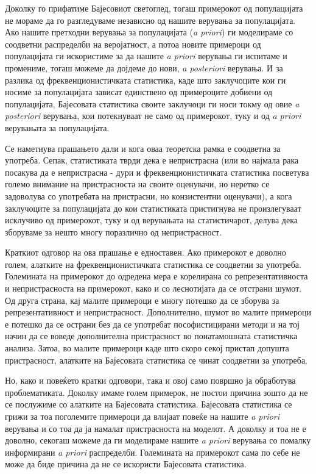 \documentclass[12pt]{article}
\numberwithin{equation}{section}
\begin{document}
Доколку го прифатиме Бајесовиот светоглед, тогаш примерокот од популацијата не мораме да го разгледуваме независно од нашите верувања за популацијата. Ако нашите претходни верувања за популацијата (\textit{a priori}) ги моделираме со соодветни распределби на веројатност, а потоа новите примероци од популацијата ги искористиме за да нашите \textit{a priori} верувања ги испитаме и промениме, тогаш можеме да дојдеме до нови, \textit{a posteriori} верувања. И за разлика од фреквенционистичката статистика, каде што заклучоците кои ги носиме за популацијата зависат единствено од примероците добиени од популацијата, Бајесовата статистика своите заклучоци ги носи токму од овие \textit{a posteriori} верувања, кои потекнуваат не само од примерокот, туку и од \textit{a priori} верувањата за популацијата.

Се наметнува прашањето дали и кога оваа теоретска рамка е соодветна за употреба. Сепак, статистиката тврди дека е непристрасна (или во најмала рака посакува да е непристрасна - дури и фреквенционистичката статистика посветува големо внимание на пристрасноста на своите оценувачи, но неретко се задоволува со употребата на пристрасни, но конзистентни оценувачи), а кога заклучоците за популацијата до кои статистиката пристигнува не произлегуваат исклучиво од примерокот, туку и од верувањата на статистичарот, делува дека зборуваме за нешто многу поразлично од непристрасност.

Краткиот одговор на ова прашање е едноставен. Ако примерокот е доволно голем, алатките на фреквенционистичката статистика се соодветни за употреба. Големината на примерокот до одредена мера е корелирана со репрезентативноста и непристрасноста на примерокот, како и со леснотијата да се отстрани шумот. Од друга страна, кај малите примероци е многу потешко да се зборува за репрезентативност и непристрасност. Дополнително, шумот во малите примероци е потешко да се острани без да се употребат пософистицирани методи и на тој начин да се воведе дополнителна пристрасност во понатамошната статистичка анализа. Затоа, во малите примероци каде што скоро секој пристап допушта пристрасност, алатките на Бајесовата статистика се чинат соодветни за употреба.

Но, како и повеќето кратки одговори, така и овој само површно ја обработува проблематиката. Доколку имаме голем примерок, не постои причина зошто да не се послужиме со алатките на Бајесовата статистика. Бајесовата статистика се грижи за тоа поголемите примероци да влијаат повеќе на нашите \textit{a priori} верувања и со тоа да ја намалат пристрасноста на моделот. А доколку и тоа не е доволно, секогаш можеме да ги моделираме нашите \textit{a priori} верувања со помалку информирани \textit{a priori} распределби. Големината на примерокот сама по себе не може да биде причина да не се искористи Бајесовата статистика.
\end{document}
